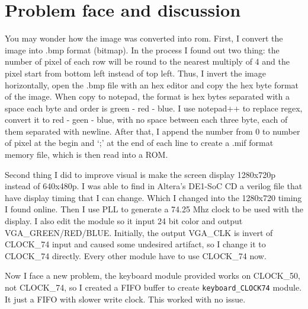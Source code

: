 \documentclass[scale = 0.9]{article}
\let\oldsection\section
\renewcommand\section{\clearpage\oldsection}
\newcommand{\code}[1]{\colorbox{light-gray}{\texttt{#1}}} %
\begin{document}

\section{Problem face and discussion}

You may wonder how the image was converted into rom. First, I convert the image into .bmp
format (bitmap). In the process I found out two thing: the number of pixel of each row will
be round to the nearest multiply of 4 and the pixel start from bottom left instead of top
left. Thus, I invert the image horizontally, open the .bmp file with an hex editor and copy
the hex byte format of the image. When copy to notepad, the format is hex bytes separated
with a space each byte and order is green - red - blue. I use notepad++ to replace regex, convert it
to red - geen - blue, with no space between each three byte, each of them separated with newline.
After that, I append the number from 0 to number of pixel at the begin and
`;' at the end of each line to create a .mif format memory file, which is then read into a ROM.

Second thing I did to improve visual is make the screen display 1280x720p instead of 640x480p.
I was able to find in Altera's DE1-SoC CD a verilog file that have display timing that I can change.
Which I changed into the 1280x720 timing I found online.
Then I use PLL to generate a 74.25 Mhz clock to be used with the display. I also edit the module
so it input 24 bit  color and output VGA\_GREEN/RED/BLUE. Initially, the output VGA\_CLK is invert
of CLOCK\_74 input and caused some undesired artifact, so I change it to CLOCK\_74 directly. Every
other module have to use CLOCK\_74 now.

Now I face a new problem, the keyboard module provided works on CLOCK\_50, not CLOCK\_74, so I created
a FIFO buffer to create \code{keyboard\_CLOCK74} module. It just a FIFO with slower write clock. This
worked with no issue.
\end{document}
